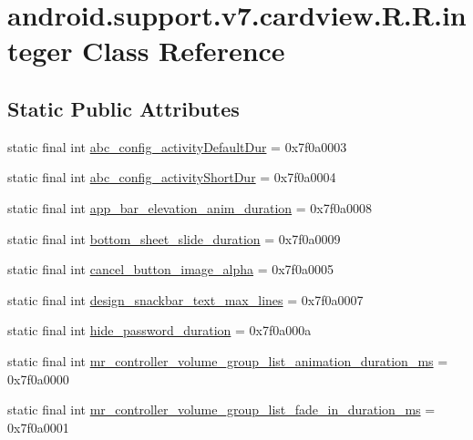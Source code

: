 \hypertarget{classandroid_1_1support_1_1v7_1_1cardview_1_1_r_1_1integer}{
\section{android.support.v7.cardview.R.R.integer Class Reference}
\label{classandroid_1_1support_1_1v7_1_1cardview_1_1_r_1_1integer}
}
\subsection*{Static Public Attributes}
\begin{CompactItemize}
\item 
static final int \hyperlink{classandroid_1_1support_1_1v7_1_1cardview_1_1_r_1_1integer_987e9432df90da842c06fd2aa6d5c8bd}{abc\_\-config\_\-activityDefaultDur} = 0x7f0a0003
\item 
static final int \hyperlink{classandroid_1_1support_1_1v7_1_1cardview_1_1_r_1_1integer_97dd911077184ef8d4fd04ebb0b5b3c5}{abc\_\-config\_\-activityShortDur} = 0x7f0a0004
\item 
static final int \hyperlink{classandroid_1_1support_1_1v7_1_1cardview_1_1_r_1_1integer_d71a794d85ec81698cb6b173e327937b}{app\_\-bar\_\-elevation\_\-anim\_\-duration} = 0x7f0a0008
\item 
static final int \hyperlink{classandroid_1_1support_1_1v7_1_1cardview_1_1_r_1_1integer_9d2d125b7e8e1fe146fd5d2be8953d2d}{bottom\_\-sheet\_\-slide\_\-duration} = 0x7f0a0009
\item 
static final int \hyperlink{classandroid_1_1support_1_1v7_1_1cardview_1_1_r_1_1integer_763f84a240d56745aff4d281c7f8af47}{cancel\_\-button\_\-image\_\-alpha} = 0x7f0a0005
\item 
static final int \hyperlink{classandroid_1_1support_1_1v7_1_1cardview_1_1_r_1_1integer_d9d4b24a67fbcbe2e72e044c06c50e49}{design\_\-snackbar\_\-text\_\-max\_\-lines} = 0x7f0a0007
\item 
static final int \hyperlink{classandroid_1_1support_1_1v7_1_1cardview_1_1_r_1_1integer_fc671a71826792c8558a949a09cafd09}{hide\_\-password\_\-duration} = 0x7f0a000a
\item 
static final int \hyperlink{classandroid_1_1support_1_1v7_1_1cardview_1_1_r_1_1integer_618130cdc9040149cca25acba0700754}{mr\_\-controller\_\-volume\_\-group\_\-list\_\-animation\_\-duration\_\-ms} = 0x7f0a0000
\item 
static final int \hyperlink{classandroid_1_1support_1_1v7_1_1cardview_1_1_r_1_1integer_15b3b6053d7e635de76c2f43347cea54}{mr\_\-controller\_\-volume\_\-group\_\-list\_\-fade\_\-in\_\-duration\_\-ms} = 0x7f0a0001

\end{CompactItemize}
